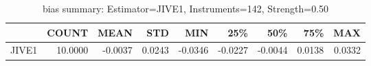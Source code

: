 \begin{table}[ht]
\centering
\caption{bias summary: Estimator=JIVE1, Instruments=142, Strength=0.50}
\begin{tabular}{lrrrrrrrr}
\toprule
 & COUNT & MEAN & STD & MIN & 25\% & 50\% & 75\% & MAX \\
\midrule
JIVE1 & 10.0000 & -0.0037 & 0.0243 & -0.0346 & -0.0227 & -0.0044 & 0.0138 & 0.0332 \\
\bottomrule
\end{tabular}
\end{table}
